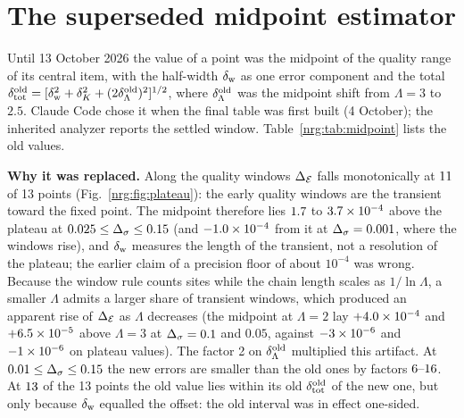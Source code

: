 \section{The superseded midpoint estimator}\label{nrg:app:midpoint}
Until 13 October 2026 the value of a point was the midpoint of the quality range of its central item, with the half-width $\delta_{\rm
w}$ as one error component and the total $\delta_{\rm tot}^{\rm old}=[\delta_{\rm w}^2+\delta_K^2+(2\delta^{\rm old}_\Lambda)^2]^{1/2}$, where
$\delta^{\rm old}_\Lambda$ was the midpoint shift from $\Lambda=3$ to $2.5$. Claude Code chose it when the final table was first built
(4 October); the inherited analyzer reports the settled window. Table~\ref{nrg:tab:midpoint} lists the old values.

\textbf{Why it was replaced.} Along the quality windows $\Delta_{\mathcal E}$ falls monotonically at $11$ of 13 points (Fig.~\ref{nrg:fig:plateau}): the
early quality windows are the transient toward the fixed point. The midpoint therefore lies $1.7$ to $3.7\times10^{-4}$
above the plateau at $0.025\le\Delta_\sigma\le0.15$ (and $-1.0\times10^{-4}$ from it at $\Delta_\sigma=0.001$, where the windows rise), and $\delta_{\rm w}$
measures the length of the transient, not a resolution of the plateau; the earlier claim of a precision floor of about $10^{-4}$ was
wrong. Because the window rule counts sites while the chain length scales as $1/\ln\Lambda$, a smaller $\Lambda$ admits a larger share
of transient windows, which produced an apparent rise of $\Delta_{\mathcal E}$ as $\Lambda$ decreases (the midpoint at $\Lambda=2$ lay
$+4.0\times10^{-4}$ and $+6.5\times10^{-5}$ above $\Lambda=3$ at $\Delta_\sigma=0.1$ and $0.05$, against $-3\times10^{-6}$ and $-1\times10^{-6}$
on plateau values). The factor 2 on $\delta^{\rm old}_\Lambda$ multiplied this artifact. At $0.01\le\Delta_\sigma\le0.15$ the new errors are
smaller than the old ones by factors $6\text{--}16$. At $13$ of the 13 points the old value lies within its old
$\dtot^{\rm old}$ of the new one, but only because $\delta_{\rm w}$ equalled the offset: the old interval was in effect one-sided.

\begin{table}[ht]\centering\scriptsize\setlength{\tabcolsep}{4pt}
\caption{The superseded estimator. Old value: quality-range midpoint with $\dtot^{\rm old}$ (two significant digits, as given in the
earlier version of this note); the half-width $\delta_{\rm w}$ and $2|\delta^{\rm old}_\Lambda|$ in units of $10^{-4}$; the value of
this note; the difference; the old status labels: (a) far above the $\varepsilon$ series compared with the old error, attributed to a
truncation bias of bosonic NRG, not used; (b) above the Borel--Pad\'e sum by about the old error, same attribution, not used; (c) at
$\Ds=0.2$, the series cannot test the point at the $10^{-3}$ level. The attribution to a truncation bias has since been withdrawn
(Sec.~\ref{nrg:sec:series}).}\label{nrg:tab:midpoint}

\end{table}

